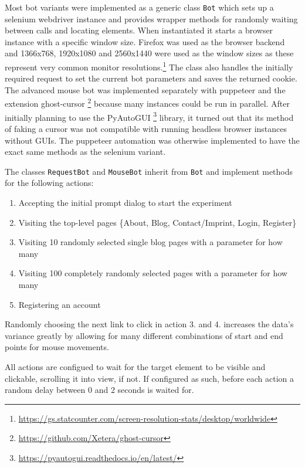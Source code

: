 \documentclass[
    fontsize=12pt,
    headings=small,
    parskip=half,           %
    bibliography=totoc,
    numbers=noenddot,       %
    open=any,               %
    final                   %
]{scrreprt}
\begin{document}
Most bot variants were implemented as a generic class \lstinline{Bot} which sets up a selenium webdriver instance and provides wrapper methods for randomly waiting between calls and locating elements. When instantiated it starts a  browser instance with a specific window size. Firefox was used as the browser backend and 1366x768, 1920x1080 and 2560x1440 were used as the window sizes as these represent very common monitor resolutions.\footnote{\url{https://gs.statcounter.com/screen-resolution-stats/desktop/worldwide}} The class also handles the initially required request to set the current bot parameters and saves the returned cookie. The advanced mouse bot was implemented separately with puppeteer and the extension ghost-cursor \footnote{\url{https://github.com/Xetera/ghost-cursor}} because many instances could be run in parallel. After initially planning to use the PyAutoGUI \footnote{\url{https://pyautogui.readthedocs.io/en/latest/}} library, it turned out that its method of faking a cursor was not compatible with running headless browser instances without GUIs. The puppeteer automation was otherwise implemented to have the exact same methods as the selenium variant.

The classes \lstinline{RequestBot} and \lstinline{MouseBot} inherit from \lstinline{Bot} and implement methods for the following actions:

\begin{enumerate}
	\item Accepting the initial prompt dialog to start the experiment
	\item Visiting the top-level pages \{About, Blog, Contact/Imprint, Login, Register\}
	\item Visiting 10 randomly selected single blog pages with a parameter for how many
	\item Visiting 100 completely randomly selected pages with a parameter for how many
	\item Registering an account
\end{enumerate}

Randomly choosing the next link to click in action 3. and 4. increases the data's variance greatly by allowing for many different combinations of start and end points for mouse movements.

All actions are configued to wait for the target element to be visible and clickable, scrolling it into view, if not. If configured as such, before each action a random delay between $0$ and $2$ seconds is waited for.
\end{document}

